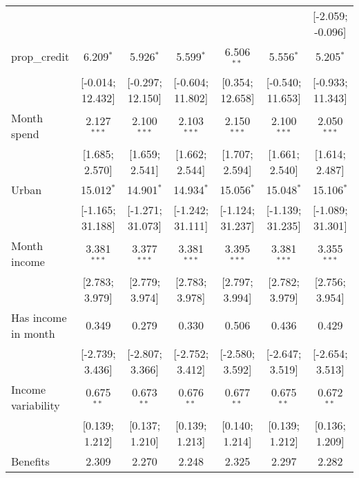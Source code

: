 \begin{table}[htbp]
\begin{threeparttable}[b]
\begin{tabular}{lcccccc}
                                        &                  &                  &                  &                  &                  & [-2.059; -0.096]\\   
         prop\_credit                   & 6.209$^{*}$      & 5.926$^{*}$      & 5.599$^{*}$      & 6.506$^{**}$     & 5.556$^{*}$      & 5.205$^{*}$\\   
                                        & [-0.014; 12.432] & [-0.297; 12.150] & [-0.604; 11.802] & [0.354; 12.658]  & [-0.540; 11.653] & [-0.933; 11.343]\\   
         Month spend                    & 2.127$^{***}$    & 2.100$^{***}$    & 2.103$^{***}$    & 2.150$^{***}$    & 2.100$^{***}$    & 2.050$^{***}$\\   
                                        & [1.685; 2.570]   & [1.659; 2.541]   & [1.662; 2.544]   & [1.707; 2.594]   & [1.661; 2.540]   & [1.614; 2.487]\\   
         Urban                          & 15.012$^{*}$     & 14.901$^{*}$     & 14.934$^{*}$     & 15.056$^{*}$     & 15.048$^{*}$     & 15.106$^{*}$\\   
                                        & [-1.165; 31.188] & [-1.271; 31.073] & [-1.242; 31.111] & [-1.124; 31.237] & [-1.139; 31.235] & [-1.089; 31.301]\\   
         Month income                   & 3.381$^{***}$    & 3.377$^{***}$    & 3.381$^{***}$    & 3.395$^{***}$    & 3.381$^{***}$    & 3.355$^{***}$\\   
                                        & [2.783; 3.979]   & [2.779; 3.974]   & [2.783; 3.978]   & [2.797; 3.994]   & [2.782; 3.979]   & [2.756; 3.954]\\   
         Has income in month            & 0.349            & 0.279            & 0.330            & 0.506            & 0.436            & 0.429\\   
                                        & [-2.739; 3.436]  & [-2.807; 3.366]  & [-2.752; 3.412]  & [-2.580; 3.592]  & [-2.647; 3.519]  & [-2.654; 3.513]\\   
         Income variability             & 0.675$^{**}$     & 0.673$^{**}$     & 0.676$^{**}$     & 0.677$^{**}$     & 0.675$^{**}$     & 0.672$^{**}$\\   
                                        & [0.139; 1.212]   & [0.137; 1.210]   & [0.139; 1.213]   & [0.140; 1.214]   & [0.139; 1.212]   & [0.136; 1.209]\\   
         Benefits                       & 2.309            & 2.270            & 2.248            & 2.325            & 2.297            & 2.282\\   

\end{tabular}
\end{threeparttable}
\end{table}
